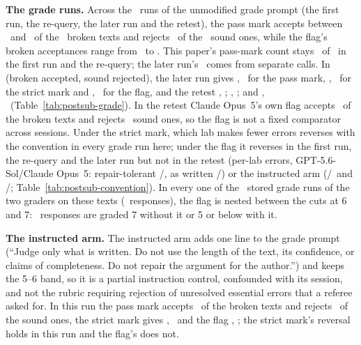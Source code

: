 \textbf{The grade runs.} Across the \CRNPlainRuns\ runs of the unmodified grade prompt (the first run, the re-query, the later run and the retest), the pass mark accepts between \CRPlainPassBrokenMin\ and \CRPlainPassBrokenMax\ of the \CRNBroken\ broken texts and rejects \CRPlainPassSoundPhrase\ of the \CRNSound\ sound ones, while the flag's broken acceptances range from \CRPlainFlagBrokenMin\ to \CRPlainFlagBrokenMax. This paper's pass-mark count stays \CRPassBrokenAccP\ of \CRNBroken\ in the first run and the re-query; the later run's \CRSepEightPassBrokenAcc\ comes from separate calls. In (broken accepted, sound rejected), the later run gives \CRSepEightPassBrokenAcc, \CRSepEightPassSoundRej\ for the pass mark, \CRSepEightStrictBrokenAcc, \CRSepEightStrictSoundRej\ for the strict mark and \CRSepEightFlagBrokenAcc, \CRSepEightFlagSoundRej\ for the flag, and the retest \CRRetestPassBrokenAcc, \CRRetestPassSoundRej; \CRRetestStrictBrokenAcc, \CRRetestStrictSoundRej; and \CRRetestFlagBrokenAcc, \CRRetestFlagSoundRej\ (Table~\ref{tab:postsub-grade}). In the retest Claude Opus~5's own flag accepts \CRRetestClaudeFlagBrokenAcc\ of the broken texts and rejects \CRRetestClaudeFlagSoundRej\ sound ones, so the flag is not a fixed comparator across sessions. Under the strict mark, which lab makes fewer errors reverses with the convention in every grade run here; under the flag it reverses in the first run, the re-query and the later run but not in the retest (per-lab errors, GPT-5.6-Sol/Claude Opus~5: repair-tolerant \CRRetestFlagErrRTGPT/\CRRetestFlagErrRTClaude, as written \CRRetestFlagErrAWGPT/\CRRetestFlagErrAWClaude) or the instructed arm (\CRInstructedFlagErrRTGPT/\CRInstructedFlagErrRTClaude\ and \CRInstructedFlagErrAWGPT/\CRInstructedFlagErrAWClaude; Table~\ref{tab:postsub-convention}). In every one of the \CRNestRuns\ stored grade runs of the two graders on these texts (\CRNestResponses\ responses), the flag is nested between the cuts at 6 and 7: \CRNestViolations\ responses are graded 7 without it or 5 or below with it.

\textbf{The instructed arm.} The instructed arm adds one line to the grade prompt (``Judge only what is written. Do not use the length of the text, its confidence, or claims of completeness. Do not repair the argument for the author.'') and keeps the 5--6 band, so it is a partial instruction control, confounded with its session, and not the rubric requiring rejection of unresolved essential errors that a referee asked for. In this run the pass mark accepts \CRInstructedPassBrokenAcc\ of the broken texts and rejects \CRInstructedPassSoundRej\ of the sound ones, the strict mark gives \CRInstructedStrictBrokenAcc, \CRInstructedStrictSoundRej\ and the flag \CRInstructedFlagBrokenAcc, \CRInstructedFlagSoundRej; the strict mark's reversal holds in this run and the flag's does not.

